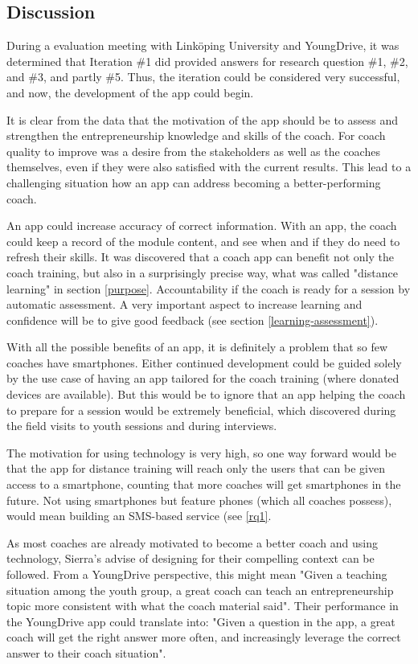 \subsection{Discussion}

During a evaluation meeting with Linköping University and YoungDrive, it was determined that Iteration \#1 did provided answers for research question \#1, \#2, and \#3, and partly \#5. Thus, the iteration could be considered very successful, and now, the development of the app could begin.

It is clear from the data that the motivation of the app should be to assess and strengthen the entrepreneurship knowledge and skills of the coach. For coach quality to improve was a desire from the stakeholders as well as the coaches themselves, even if they were also satisfied with the current results. This lead to a challenging situation how an app can address becoming a better-performing coach.

An app could increase accuracy of correct information. With an app, the coach could keep a record of the module content, and see when and if they do need to refresh their skills. It was discovered that a coach app can benefit not only the coach training, but also in a surprisingly precise way, what was called "distance learning" in section \ref{purpose}. Accountability if the coach is ready for a session by automatic assessment. A very important aspect to increase learning and confidence will be to give good feedback (see section \ref{learning-assessment}).

With all the possible benefits of an app, it is definitely a problem that so few coaches have smartphones. Either continued development could be guided solely by the use case of having an app tailored for the coach training (where donated devices are available). But this would be to ignore that an app helping the coach to prepare for a session would be extremely beneficial, which discovered during the field visits to youth sessions and during interviews.

The motivation for using technology is very high, so one way forward would be that the app for distance training will reach only the users that can be given access to a smartphone, counting that more coaches will get smartphones in the future. Not using smartphones but feature phones (which all coaches possess), would mean building an SMS-based service (see \ref{rq1}.

As most coaches are already motivated to become a better coach and using technology, Sierra's \citep{sierra} advise of designing for their compelling context can be followed. From a YoungDrive perspective, this might mean "Given a teaching situation among the youth group, a great coach can teach an entrepreneurship topic more consistent with what the coach material said". Their performance in the YoungDrive app could translate into: "Given a question in the app, a great coach will get the right answer more often, and increasingly leverage the correct answer to their coach situation".


